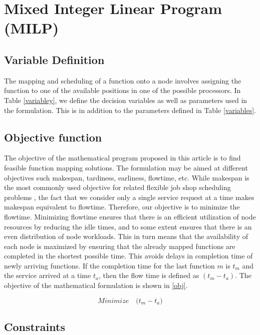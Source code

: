 \documentclass[conference]{IEEEtran}
\begin{document}
\section{Mixed Integer Linear Program (MILP)}\label{milp}

\subsection{Variable Definition}

The mapping and scheduling of a function onto a node involves assigning the function to one of the available positions in one of the possible processors. In Table \ref{variabley}, we define the decision variables as well as parameters used in the formulation. This is in addition to the parameters defined in Table \ref{variables}.
\subsection{Objective function}
The objective of the mathematical program proposed in this article is to find feasible function mapping solutions. The formulation may be aimed at different objectives such makespan, tardiness, earliness, flowtime, etc. While makespan  is the most commonly used objective for related flexible job shop scheduling problems \cite{Roshanaei13}, the fact that we consider only a single service request at a time makes makespan equivalent to flowtime. Therefore, our objective is to minimize the flowtime. Minimizing flowtime ensures that there is an efficient utilization of node resources by reducing the idle times, and to some extent ensures that there is an even distribution of node workloads. This in turn means that the availability of each node is maximized by ensuring that the already mapped functions are completed in the shortest possible time. This avoids delays in completion time of newly arriving functions. If the completion time for the last function $m$ is $t_m$ and the service arrived at a time $t_a$, then the flow time is defined as $(t_m - t_a)$. The objective of the mathematical formulation is shown in \eqref{obj}. 

\begin{equation}
Minimize \quad \big(t_m - t_a \big)
\label{obj}
\end{equation}

\subsection{Constraints}
\end{document}
